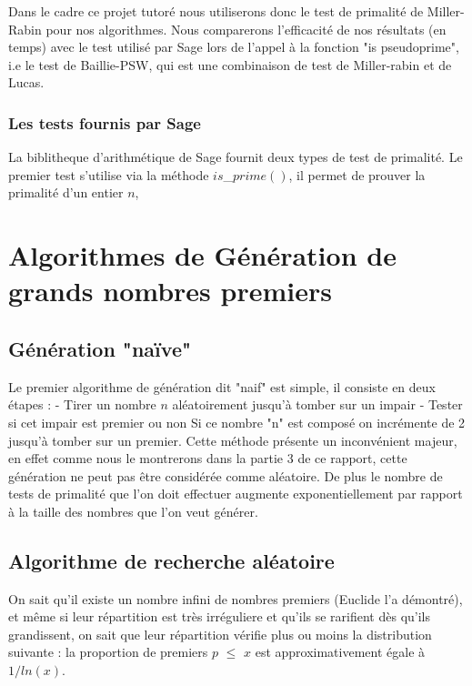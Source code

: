 \documentclass[a4paper,11pt]{article}
\begin{document}
Dans le cadre ce projet tutoré nous utiliserons donc le test de primalité de Miller-Rabin pour nos algorithmes. Nous comparerons l'efficacité de nos résultats (en temps) avec le test utilisé par Sage lors de l'appel à la fonction "is pseudoprime", i.e le test de Baillie-PSW, qui est une combinaison de test de Miller-rabin et de Lucas.

\subsubsection{Les tests fournis par Sage }
La biblitheque d'arithmétique de Sage fournit deux types de test de primalité. Le premier test s'utilise via la méthode $is$\_$prime()$, il permet de prouver la primalité d'un entier $n$, 


\section{Algorithmes de Génération de grands nombres premiers}

\subsection{Génération "naïve"}

Le premier algorithme de génération dit "naif" est simple, il consiste en deux étapes :
\newline
\medbreak
    - Tirer un nombre $n$ aléatoirement jusqu'à tomber sur un impair
\smallbreak
\newline
    - Tester si cet impair est premier ou non\newline
        Si ce nombre "n" est composé on incrémente de 2 jusqu'à tomber sur un premier.
\newline
Cette méthode présente un inconvénient majeur, en effet comme nous le montrerons dans la partie 3 de ce rapport, cette génération ne peut pas être considérée comme aléatoire. 
De plus le nombre de tests de primalité que l'on doit effectuer augmente exponentiellement par rapport à la taille des nombres que l'on veut générer. 

\subsection{Algorithme de recherche aléatoire }
On sait qu'il existe un nombre infini de nombres premiers (Euclide l'a démontré),  et même si leur répartition est très irréguliere et qu'ils se rarifient dès qu'ils grandissent, on sait que leur répartition vérifie plus ou moins la distribution suivante :
la proportion de premiers $p$ $\leq$ $x$ est approximativement égale à $1/ln(x)$.
\end{document}
